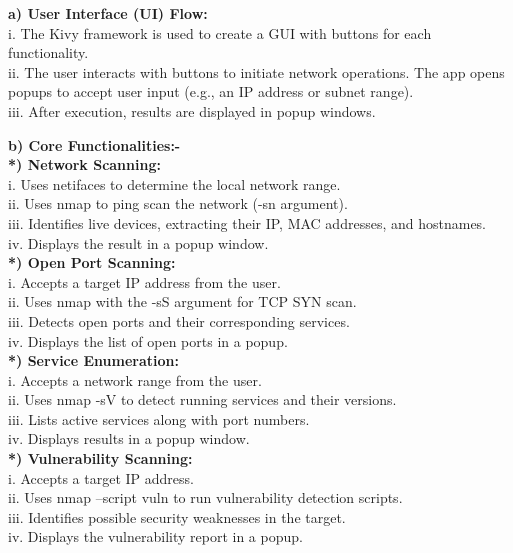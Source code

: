 \documentclass[conference]{IEEEtran}
\begin{document}
\textbf{a) User Interface (UI) Flow:}\\
i. The Kivy framework is used to create a GUI with buttons for each functionality.\\
ii. The user interacts with buttons to initiate network operations.
The app opens popups to accept user input (e.g., an IP address or subnet range).\\
iii. After execution, results are displayed in popup windows.

\textbf{b) Core Functionalities:-}\\

\textbf{*) Network Scanning:}\\
i. Uses netifaces to determine the local network range.\\
ii. Uses nmap to ping scan the network (-sn argument).\\
iii. Identifies live devices, extracting their IP, MAC addresses, and hostnames.\\
iv. Displays the result in a popup window.\\

\textbf{*) Open Port Scanning:}\\
i. Accepts a target IP address from the user.\\
ii. Uses nmap with the -sS argument for TCP SYN scan.\\
iii. Detects open ports and their corresponding services.\\
iv. Displays the list of open ports in a popup.\\

\textbf{*) Service Enumeration:}\\
i. Accepts a network range from the user.\\
ii. Uses nmap -sV to detect running services and their versions.\\
iii. Lists active services along with port numbers.\\
iv. Displays results in a popup window.\\

\textbf{*) Vulnerability Scanning:}\\
i. Accepts a target IP address.\\
ii. Uses nmap --script vuln to run vulnerability detection scripts.\\
iii. Identifies possible security weaknesses in the target.\\
iv. Displays the vulnerability report in a popup.\\
\end{document}
